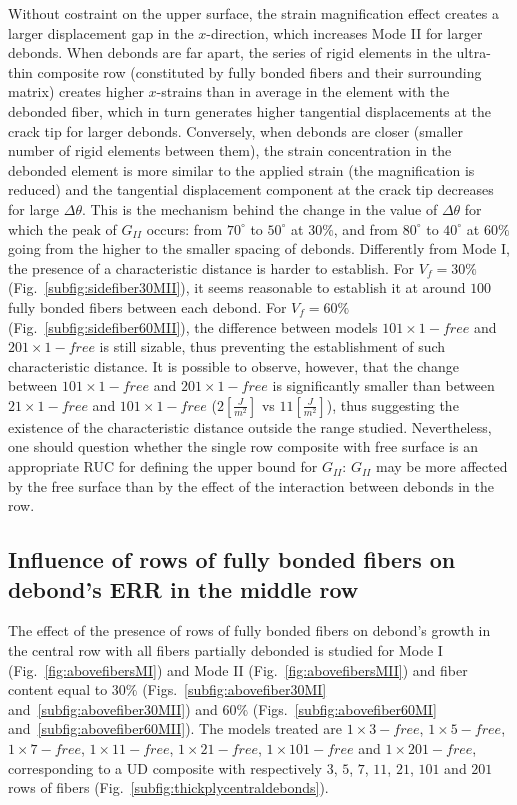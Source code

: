 \documentclass[review]{elsarticle}
\begin{document}
Without costraint on the upper surface, the strain magnification effect creates a larger displacement gap in the $x$-direction, which increases Mode II for larger debonds. When debonds are far apart, the series of rigid elements in the ultra-thin composite row (constituted by fully bonded fibers and their surrounding matrix) creates higher $x$-strains than in average in the element with the debonded fiber, which in turn generates higher tangential displacements at the crack tip for larger debonds. Conversely, when debonds are closer (smaller number of rigid elements between them), the strain concentration in the debonded element is more similar to the applied strain (the magnification is reduced) and the tangential displacement component at the crack tip decreases for large $\Delta\theta$. This is the mechanism behind the change in the value of $\Delta\theta$ for which the peak of $G_{II}$ occurs: from $70^{\circ}$ to $50^{\circ}$ at $30\%$, and from $80^{\circ}$ to $40^{\circ}$ at $60\%$ going from the higher to the smaller spacing of debonds. Differently from Mode I, the presence of a characteristic distance is harder to establish. For $V_{f}=30\%$ (Fig.~\ref{subfig:sidefiber30MII}), it seems reasonable to establish it at around $100$ fully bonded fibers between each debond. For $V_{f}=60\%$ (Fig.~\ref{subfig:sidefiber60MII}), the difference between models $101\times 1-free$ and $201\times 1-free$ is still sizable, thus preventing the establishment of such characteristic distance. It is possible to observe, however, that the change between $101\times 1-free$ and $201\times 1-free$ is significantly smaller than between $21\times 1-free$ and $101\times 1-free$ ($2\left[\frac{J}{m^{2}}\right]$ vs $11\left[\frac{J}{m^{2}}\right]$), thus suggesting the existence of the characteristic distance outside the range studied. Nevertheless, one should question whether the single row composite with free surface is an appropriate RUC for defining the upper bound for $G_{II}$: $G_{II}$ may be more affected by the free surface than by the effect of the interaction between debonds in the row.

\subsection{Influence of rows of fully bonded fibers on debond's ERR in the middle row}\label{subsec:fiberabove}

The effect of the presence of rows of fully bonded fibers on debond's growth in the central row with all fibers partially debonded is studied for Mode I (Fig.~\ref{fig:abovefibersMI}) and Mode II (Fig.~\ref{fig:abovefibersMII}) and fiber content equal to $30\%$ (Figs.~\ref{subfig:abovefiber30MI} and~\ref{subfig:abovefiber30MII}) and $60\%$ (Figs.~\ref{subfig:abovefiber60MI} and~\ref{subfig:abovefiber60MII}). The models treated are $1\times 3-free$, $1\times 5-free$, $1\times 7-free$, $1\times 11-free$, $1\times 21-free$, $1\times 101-free$ and $1\times 201-free$, corresponding to a UD composite with respectively $3$, $5$, $7$, $11$, $21$, $101$ and $201$ rows of fibers (Fig.~\ref{subfig:thickplycentraldebonds}).
\end{document}
